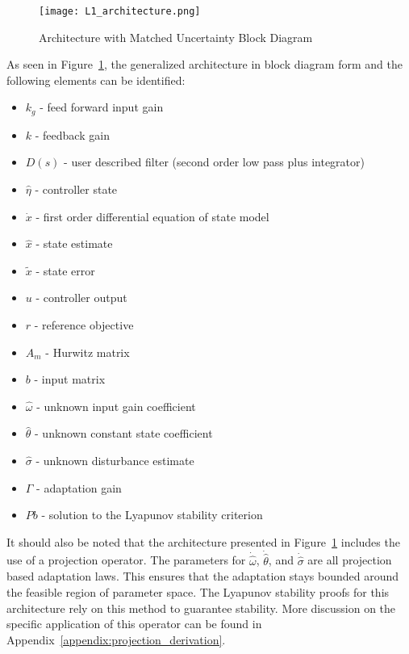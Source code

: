 \begin{figure}[h!]
 \centering
  \texttt{[image: L1\_architecture.png]}
  \caption{\Lone Architecture with Matched Uncertainty Block Diagram \cite{hovakimyan2010l1} }
  \label{fig:l1_architecture}
\end{figure}

As seen in Figure~\ref{fig:l1_architecture}, the generalized \Lone architecture in block diagram form and the following elements can be identified:
\begin{itemize}
 \item[] $k_g$ - feed forward input gain
 \item[] $k$ - feedback gain
 \item[] $D(s)$ - user described filter (second order low pass plus integrator)
 \item[] $\hat{\eta}$ - \Lone controller state
 \item[] $\dot{x}$ - first order differential equation of state model
 \item[] $\hat{x}$ - state estimate
 \item[] $\tilde{x}$ - state error
 \item[] $u$ - controller output
 \item[] $r$ - reference objective
 \item[] $A_m$ - Hurwitz matrix
 \item[] $b$ - input matrix
 \item[] $\hat{\omega}$ - unknown input gain coefficient
 \item[] $\hat{\theta}$ - unknown constant state coefficient
 \item[] $\hat{\sigma}$ - unknown disturbance estimate
 \item[] $\Gamma$ - adaptation gain
 \item[] $Pb$ - solution to the Lyapunov stability criterion 
\end{itemize}

It should also be noted that the architecture presented in Figure~\ref{fig:l1_architecture} includes the use of a projection operator.  The parameters for $\dot{\hat{\omega}}$, $\dot{\hat{\theta}}$, and $\dot{\hat{\sigma}}$ are all projection based adaptation laws.  This ensures that the adaptation stays bounded around the feasible region of parameter space.  The Lyapunov stability proofs for this architecture rely on this method to guarantee stability\cite{hovakimyan2010l1}.  More discussion on the specific application of this operator can be found in Appendix~\ref{appendix:projection_derivation}.

